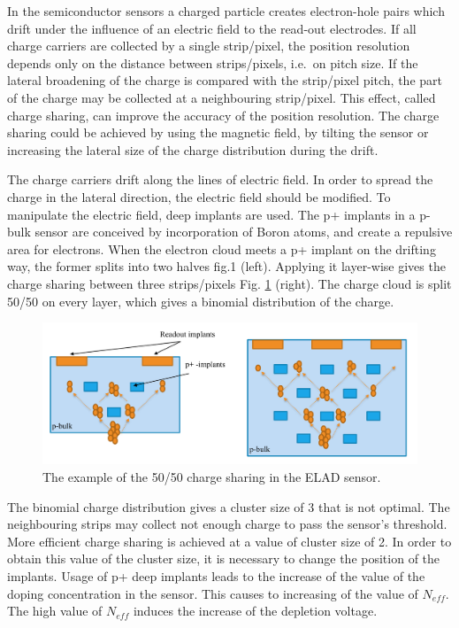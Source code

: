 
In the semiconductor sensors a charged particle creates electron-hole pairs which drift under the influence of an electric field to the read-out electrodes. 
If all charge carriers are collected by a single strip/pixel, the position resolution depends only on the distance between strips/pixels, i.e.\ on pitch size. 
If the lateral broadening of the charge is compared with the strip/pixel pitch, the part of the charge may be collected at a neighbouring strip/pixel. 
This effect, called charge sharing, can improve the accuracy of the position resolution. 
The charge sharing could be achieved by using the magnetic field, by tilting the sensor or increasing the lateral size of the charge distribution during the drift.

The charge carriers drift along the lines of electric field. In order to spread the charge in the lateral direction, the electric field should be modified. 
To manipulate the electric field, deep implants are used. 
The p+ implants in a p-bulk sensor are conceived by incorporation of Boron atoms, and  create a repulsive area for electrons. 
When the electron cloud meets a p+ implant on the drifting way, the former splits into two halves fig.1 (left). 
Applying it layer-wise gives the charge sharing between three strips/pixels Fig. \ref{fig:binomial} (right).  
The charge cloud is split 50/50 on every layer, which gives a binomial distribution of the charge.

\begin{figure}[!t]
 \center
 \includegraphics[trim= 0 0 0 0, width=.65\linewidth]{pictures/binomial.png}
 \caption[short description here]
 {The example of the 50/50 charge sharing in the ELAD sensor. 
 }
 \label{fig:binomial}
\end{figure}

The binomial charge distribution gives a cluster size of 3 that is not optimal. 
The neighbouring strips may collect not enough charge to pass the sensor's threshold. 
More efficient charge sharing is achieved at a value of cluster size of 2. 
In order to obtain this value of the cluster size, it is necessary to change the position of the implants. 
Usage of p+ deep implants leads to the increase of the value of the doping concentration in the sensor. 
This causes to increasing of the value of $N_{eff}$. The high value of $N_{eff}$ induces the increase of the depletion voltage. 

